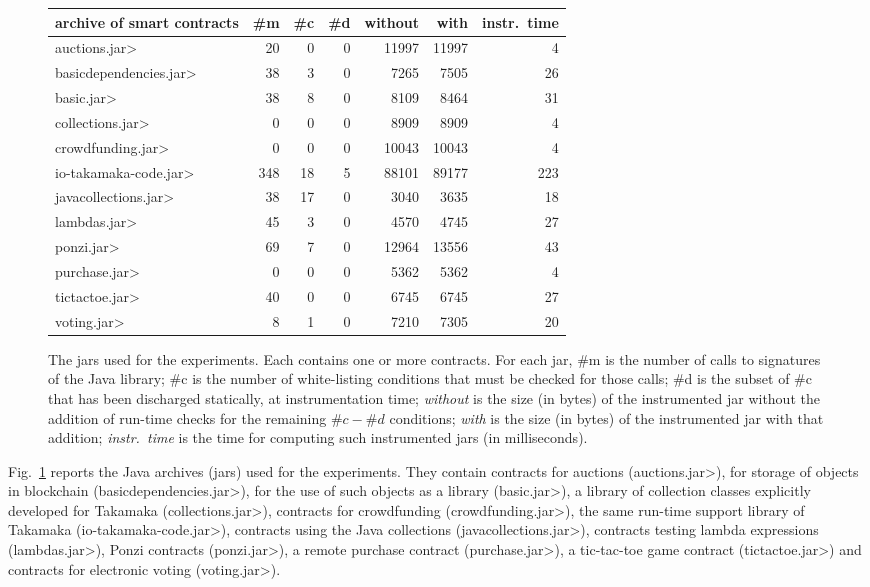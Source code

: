 \begin{figure}[t]
  \begin{center}
{\small\begin{tabular}{|l||r|r|r||r|r||r|}
  \hline
  archive of smart contracts & \#m & \#c & \#d & without & with & instr.\ time \\\hline\hline
  \<auctions.jar> & 20 & 0 & 0 & 11997 & 11997 & 4 \\\hline
  \<basicdependencies.jar> & 38 & 3 & 0 & 7265 & 7505 & 26 \\\hline
  \<basic.jar> & 38 & 8 & 0 & 8109 & 8464 & 31 \\\hline
  \<collections.jar> & 0 & 0 & 0 & 8909 & 8909 & 4 \\\hline
  \<crowdfunding.jar> & 0 & 0 & 0 & 10043 & 10043 & 4 \\\hline
  \<io-takamaka-code.jar> & 348 & 18 & 5 & 88101 & 89177 & 223 \\\hline
  \<javacollections.jar> & 38 & 17 & 0 & 3040 & 3635 & 18 \\\hline
  \<lambdas.jar> & 45 & 3 & 0 & 4570 & 4745 & 27 \\\hline
  \<ponzi.jar> & 69 & 7 & 0 & 12964 & 13556 & 43 \\\hline
  \<purchase.jar> & 0 & 0 & 0 & 5362 & 5362 & 4 \\\hline
  \<tictactoe.jar> & 40 & 0 & 0 & 6745 & 6745 & 27 \\\hline
  \<voting.jar> & 8 & 1 & 0 & 7210 & 7305 & 20 \\\hline
\end{tabular}}
  \end{center}
  \caption{The jars used for the experiments. Each
    contains one or more contracts. For each jar, \#m is the number
    of calls to signatures of the Java library;
    \#c is the number of white-listing conditions that must be checked
    for those calls; \#d is the subset of \#c that has been discharged
    statically, at instrumentation time; \emph{without} is the size
    (in bytes) of the instrumented jar without the addition of run-time checks
    for the remaining $\#c - \#d$ conditions; \emph{with}
    is the size (in bytes) of the instrumented jar with that addition;
    \emph{instr.\ time} is the time for computing such instrumented jars (in milliseconds).}
  \label{fig:experiments}
  \end{figure}

Fig.~\ref{fig:experiments} reports the Java archives (jars) used for the experiments.
They contain contracts for auctions (\<auctions.jar>), for storage of
objects in blockchain (\<basicdependencies.jar>), for the use of such objects
as a library (\<basic.jar>), a library of collection classes explicitly developed
for Takamaka (\<collections.jar>), contracts for crowdfunding (\<crowdfunding.jar>),
the same run-time support library of Takamaka (\<io-takamaka-code.jar>),
contracts using the Java collections (\<javacollections.jar>), contracts
testing lambda expressions (\<lambdas.jar>), Ponzi contracts
(\<ponzi.jar>), a remote purchase contract (\<purchase.jar>), a tic-tac-toe
game contract (\<tictactoe.jar>) and contracts for electronic voting (\<voting.jar>).

